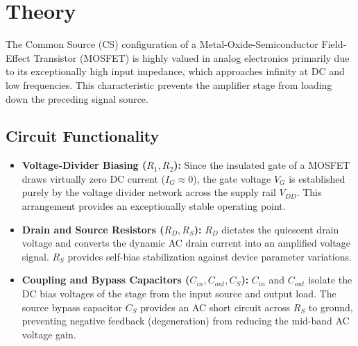 \section{Theory}
The Common Source (CS) configuration of a Metal-Oxide-Semiconductor Field-Effect Transistor (MOSFET) is highly valued in analog electronics primarily due to its exceptionally high input impedance, which approaches infinity at DC and low frequencies. This characteristic prevents the amplifier stage from loading down the preceding signal source.

\subsection{Circuit Functionality}
\begin{itemize}
	\item \textbf{Voltage-Divider Biasing ($R_1, R_2$):} Since the insulated gate of a MOSFET draws virtually zero DC current ($I_G \approx 0$), the gate voltage $V_G$ is established purely by the voltage divider network across the supply rail $V_{DD}$. This arrangement provides an exceptionally stable operating point.
	\item \textbf{Drain and Source Resistors ($R_D, R_S$):} $R_D$ dictates the quiescent drain voltage and converts the dynamic AC drain current into an amplified voltage signal. $R_S$ provides self-bias stabilization against device parameter variations.
	\item \textbf{Coupling and Bypass Capacitors ($C_{in}, C_{out}, C_S$):} $C_{in}$ and $C_{out}$ isolate the DC bias voltages of the stage from the input source and output load. The source bypass capacitor $C_S$ provides an AC short circuit across $R_S$ to ground, preventing negative feedback (degeneration) from reducing the mid-band AC voltage gain.
\end{itemize}

